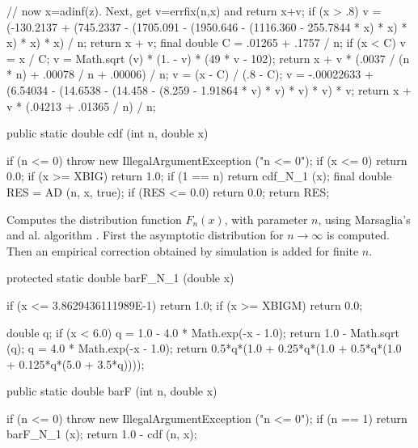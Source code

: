\begin{code}
\begin{hide}
{      // now x=adinf(z). Next, get v=errfix(n,x) and return x+v;
      if (x > .8) {
         v = (-130.2137 + (745.2337 - (1705.091 - (1950.646 - (1116.360 -
                        255.7844 * x) * x) * x) * x) * x) / n;
         return x + v;
      }
      final double C = .01265 + .1757 / n;
      if (x < C) {
         v = x / C;
         v = Math.sqrt (v) * (1. - v) * (49 * v - 102);
         return x + v * (.0037 / (n * n) + .00078 / n + .00006) / n;
      }
      v = (x - C) / (.8 - C);
      v = -.00022633 + (6.54034 - (14.6538 - (14.458 - (8.259 -
               1.91864 * v) * v) * v) * v) * v;
      return x + v * (.04213 + .01365 / n) / n;
   }
\end{hide}

   public static double cdf (int n, double x)\begin{hide} {
      if (n <= 0)
         throw new IllegalArgumentException ("n <= 0");
      if (x <= 0)
         return 0.0;
      if (x >= XBIG)
         return 1.0;
      if (1 == n)
         return cdf_N_1 (x);
      final double RES = AD (n, x, true);
      if (RES <= 0.0)
         return 0.0;
      return RES;
   }\end{hide}
\end{code}
\begin{tabb}
  Computes the \ad{} distribution function $F_n(x)$, with parameter $n$,
  using Marsaglia's and al. algorithm \cite{tMAR04a}. First the asymptotic
  distribution for $n\to\infty$ is computed.
  Then an empirical correction obtained by simulation is added for finite $n$.
 \end{tabb}
\begin{code}\begin{hide}

   protected static double barF_N_1 (double x)
   {
      if (x <= 3.8629436111989E-1)
         return 1.0;
      if (x >= XBIGM)
         return 0.0;

      double q;
      if (x < 6.0) {
         q = 1.0 - 4.0 * Math.exp(-x - 1.0);
         return 1.0 - Math.sqrt (q);
      }
      q = 4.0 * Math.exp(-x - 1.0);
      return 0.5*q*(1.0 + 0.25*q*(1.0 + 0.5*q*(1.0 + 0.125*q*(5.0 + 3.5*q))));
   }\end{hide}

   public static double barF (int n, double x)\begin{hide} {
      if (n <= 0)
        throw new IllegalArgumentException ("n <= 0");
      if (n == 1)
         return barF_N_1 (x);
      return 1.0 - cdf (n, x);
   }\end{hide}
\end{code}
